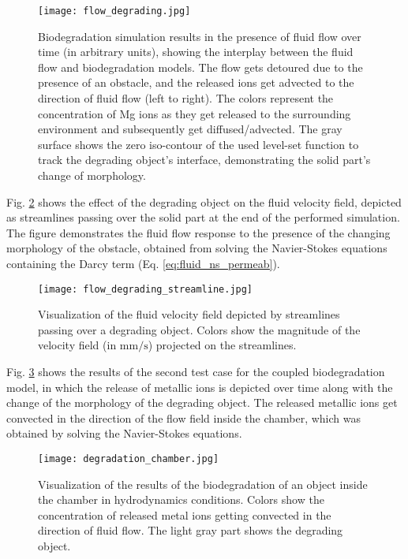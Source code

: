 \begin{figure}[h]
\centering
\medskip
\texttt{[image: flow\_degrading.jpg]}
\caption[Biodegradation simulation results in the presence of fluid flow]{Biodegradation simulation results in the presence of fluid flow over time (in arbitrary units), showing the interplay between the fluid flow and biodegradation models. The flow gets detoured due to the presence of an obstacle, and the released ions get advected to the direction of fluid flow (left to right). The colors represent the concentration of Mg ions as they get released to the surrounding environment and subsequently get diffused/advected. The gray surface shows the zero iso-contour of the used level-set function to track the degrading object's interface, demonstrating the solid part's change of morphology.} \label{fig:fluid_flow_degrading}
\end{figure}

Fig. \ref{fig:fluid_flow_degrading_streamline} shows the effect of the degrading object on the fluid velocity field, depicted as streamlines passing over the solid part at the end of the performed simulation. The figure demonstrates the fluid flow response to the presence of the changing morphology of the obstacle, obtained from solving the Navier-Stokes equations containing the Darcy term (Eq. \ref{eq:fluid_ns_permeab}).


\begin{figure}[h]
\centering
\medskip
\texttt{[image: flow\_degrading\_streamline.jpg]}
\caption[Fluid flow streamlines in the presence of a degrading object]{Visualization of the fluid velocity field depicted by streamlines passing over a degrading object. Colors show the magnitude of the velocity field (in $\mathrm{mm}/\mathrm{s}$) projected on the streamlines.} \label{fig:fluid_flow_degrading_streamline}
\end{figure}


Fig. \ref{fig:fluid_degradation_chamber} shows the results of the second test case for the coupled biodegradation model, in which the release of metallic ions is depicted over time along with the change of the morphology of the degrading object. The released metallic ions get convected in the direction of the flow field inside the chamber, which was obtained by solving the Navier-Stokes equations.


\begin{figure}[h]
\centering
\medskip
\texttt{[image: degradation\_chamber.jpg]}
\caption[Visualization of the biodegradation inside the chamber in the presence of fluid flow]{Visualization of the results of the biodegradation of an object inside the chamber in hydrodynamics conditions. Colors show the concentration of released metal ions getting convected in the direction of fluid flow. The light gray part shows the degrading object.} \label{fig:fluid_degradation_chamber}
\end{figure}


